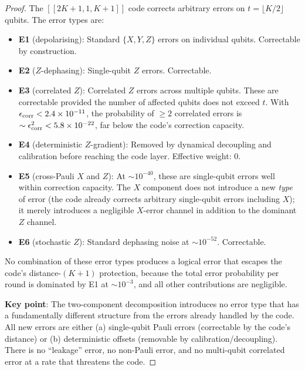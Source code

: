 \documentclass[11pt]{article}
\theoremstyle{definition}
\theoremstyle{remark}
\newcommand{\ee}[1]{\times 10^{#1}}
\begin{document}
\begin{proof}
The $[[2K{+}1,1,K{+}1]]$ code corrects arbitrary errors on
$t = \lfloor K/2 \rfloor$ qubits. The error types are:

\begin{itemize}
  \item \textbf{E1} (depolarising): Standard $\{X, Y, Z\}$ errors
    on individual qubits. Correctable by construction.

  \item \textbf{E2} ($Z$-dephasing): Single-qubit $Z$ errors.
    Correctable.

  \item \textbf{E3} (correlated $Z$): Correlated $Z$ errors across
    multiple qubits. These are correctable provided the number of
    affected qubits does not exceed $t$. With
    $\epsilon_{\rm corr} < 2.4\ee{-11}$, the probability of
    $\geq 2$ correlated errors is $\sim \epsilon_{\rm corr}^2
    < 5.8\ee{-22}$, far below the code's correction capacity.

  \item \textbf{E4} (deterministic $Z$-gradient): Removed by
    dynamical decoupling and calibration before reaching the code
    layer. Effective weight: 0.

  \item \textbf{E5} (cross-Pauli $X$ and $Z$): At $\sim 10^{-40}$,
    these are single-qubit errors well within correction capacity.
    The $X$ component does not introduce a new \emph{type} of error
    (the code already corrects arbitrary single-qubit errors including
    $X$); it merely introduces a negligible $X$-error channel
    in addition to the dominant $Z$ channel.

  \item \textbf{E6} (stochastic $Z$): Standard dephasing noise at
    $\sim 10^{-52}$. Correctable.
\end{itemize}

No combination of these error types produces a logical error that
escapes the code's distance-$(K{+}1)$ protection, because the total
error probability per round is dominated by E1 at $\sim 10^{-3}$,
and all other contributions are negligible.

\textbf{Key point}: The two-component decomposition introduces no
error type that has a fundamentally different structure from the
errors already handled by the code. All new errors are either (a)
single-qubit Pauli errors (correctable by the code's distance) or
(b) deterministic offsets (removable by calibration/decoupling).
There is no ``leakage'' error, no non-Pauli error, and no
multi-qubit correlated error at a rate that threatens the code.
\end{proof}
\end{document}
